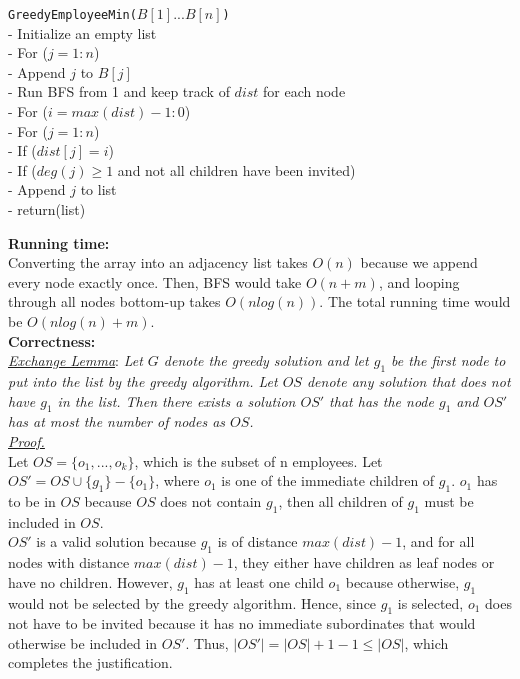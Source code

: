 \documentclass{exam}
\begin{document}
\begin{questions}
\begin{framed}
{\tt GreedyEmployeeMin($B[1]...B[n]$)}\\
\hspace*{0.1in} - Initialize an empty list\\
\hspace*{0.1in} - For ($j=1:n$)\\
\hspace*{0.3in} - Append $j$ to $B[j]$\\
\hspace*{0.1in} - Run BFS from 1 and keep track of $dist$ for each node\\
\hspace*{0.1in} - For ($i=max(dist)-1:0$)\\
\hspace*{0.3in} - For ($j=1:n$)\\
\hspace*{0.5in} - If ($dist[j]=i$)\\
\hspace*{0.7in} - If ($deg(j)\geq 1$ and not all children have been invited)\\
\hspace*{0.9in} - Append $j$ to list\\
\hspace*{0.1in} - return(list)
\end{framed}

{\bf Running time:}\\
Converting the array into an adjacency list takes $O(n)$ because we append every node exactly once. Then, BFS would take $O(n+m)$, and looping through all nodes bottom-up takes $O(nlog(n))$. The total running time would be $O(nlog(n)+m)$.\\ 

{\bf Correctness:}\\
\underline{\it Exchange Lemma}: {\it Let $G$ denote the greedy solution and let $g_1$ be the first node to put into the list by the greedy algorithm. Let $OS$ denote any solution that does not have $g_1$ in the list. Then there exists a solution $OS'$ that has the node $g_1$ and $OS'$ has at most the number of nodes as $OS$.}\\

\underline{\it Proof.}\\
Let $OS = \{o_1, ..., o_k\}$, which is the subset of n employees. Let $OS'=OS \cup\{g_1\}-\{o_1\}$, where $o_1$ is one of the immediate children of $g_1$. $o_1$ has to be in $OS$ because $OS$ does not contain $g_1$, then all children of $g_1$ must be included in $OS$.\\
$OS'$ is a valid solution because $g_1$ is of distance $max(dist)-1$, and for all nodes with distance $max(dist)-1$, they either have children as leaf nodes or have no children. However, $g_1$ has at least one child $o_1$ because otherwise, $g_1$ would not be selected by the greedy algorithm. Hence, since $g_1$ is selected, $o_1$ does not have to be invited because it has no immediate subordinates that would otherwise be included in $OS'$. Thus, $|OS'|=|OS|+1-1\leq |OS|$, which completes the justification.\\


\end{questions}
\end{document}
